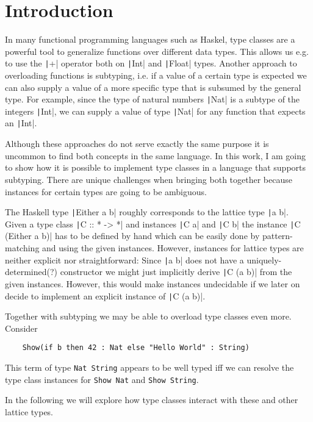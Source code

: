 
\chapter{Introduction}\label{ch:intro}


In many functional programming languages such as Haskel, type classes are a powerful tool to generalize functions over different data types.
This allows us e.g. to use the \texttt|+| operator both on \texttt|Int| and \texttt|Float| types.
Another approach to overloading functions is subtyping, i.e. if a value of a certain type is expected we can also supply a value of a more specific type that is subsumed by the general type.
For example, since the type of natural numbers \texttt|Nat| is a subtype of the integers \texttt|Int|, we can supply a value of type \texttt|Nat| for any function that expects an \texttt|Int|.

Although these approaches do not serve exactly the same purpose it is uncommon to find both concepts in the same language.
In this work, I am going to show how it is possible to implement type classes in a language that supports subtyping.
There are unique challenges when bringing both together because instances for certain types are going to be ambiguous.

The Haskell type \texttt|Either a b| roughly corresponds to the lattice type \texttt|a \/ b|.
Given a type class \texttt|C :: * -> *| and instances \texttt|C a| and \texttt|C b| the instance \texttt|C (Either a b)| has to be defined by hand which can be easily done by pattern-matching and using the given instances.
However, instances for lattice types are neither explicit nor straightforward:
Since \texttt|a \/ b| does not have a uniquely-determined(?) constructor we might just implicitly derive \texttt|C (a \/ b)| from the given instances.
However, this would make instances undecidable if we later on decide to implement an explicit instance of \texttt|C (a \/ b)|.

Together with subtyping we may be able to overload type classes even more.
Consider
\begin{verbatim}
    Show(if b then 42 : Nat else "Hello World" : String)
\end{verbatim}
This term of type \texttt{Nat \/ String} appears to be well typed iff we can resolve the type class instances for \texttt{Show Nat} and \texttt{Show String}.

In the following we will explore how type classes interact with these and other lattice types.
